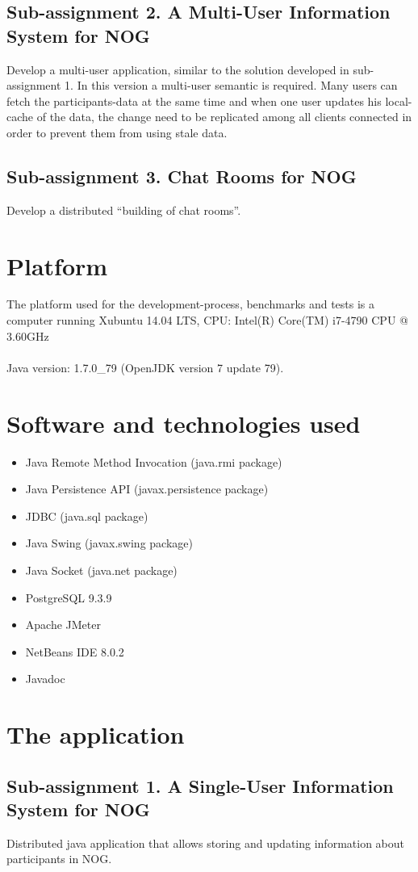 \documentclass[a4paper, 11pt]{article}
\begin{document}
\subsection{Sub-assignment 2. A Multi-User Information System for NOG}
Develop a multi-user application, similar to the solution developed in sub-assignment 1. In this version a multi-user semantic is required. Many users can fetch the participants-data at the same time and when one user updates his local-cache of the data, the change need to be replicated among all clients connected in order to prevent them from using stale data.
\subsection{Sub-assignment 3. Chat Rooms for NOG}
Develop a distributed ``building of chat rooms''.

\newpage
\section{Platform}
The platform used for the development-process, benchmarks and tests is a computer running Xubuntu 14.04 LTS, CPU: Intel(R) Core(TM) i7-4790 CPU @ 3.60GHz \\ \\
Java version: 1.7.0\_79  (OpenJDK version 7 update 79).
\newpage
\section{Software and technologies used}
\begin{itemize}
\item Java Remote Method Invocation (java.rmi package)
\item Java Persistence API (javax.persistence package)
\item JDBC (java.sql package)
\item Java Swing (javax.swing package)
\item Java Socket (java.net package)
\item PostgreSQL 9.3.9
\item Apache JMeter
\item NetBeans IDE 8.0.2
\item Javadoc
\end{itemize}
\newpage
\section{The application}
\subsection{Sub-assignment 1. A Single-User Information System for NOG}
Distributed java application that allows storing and updating information about participants in NOG. 
\end{document}
